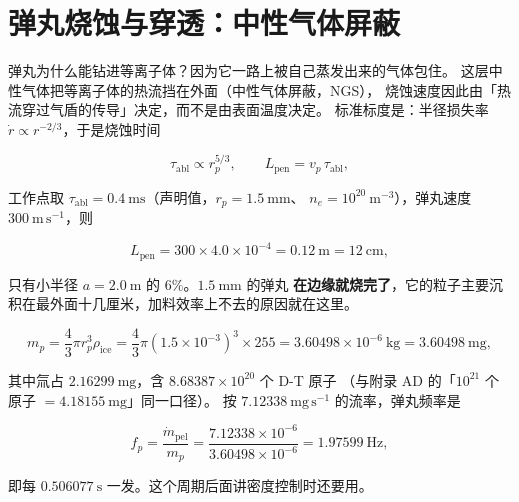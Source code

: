 \section{弹丸烧蚀与穿透：中性气体屏蔽}
\label{sec:app-aj-pellet}

弹丸为什么能钻进等离子体？因为它一路上被自己蒸发出来的气体包住。
这层中性气体把等离子体的热流挡在外面（中性气体屏蔽，NGS），
烧蚀速度因此由「热流穿过气盾的传导」决定，而不是由表面温度决定。
标准标度是：半径损失率 $\dot r \propto r^{-2/3}$，于是烧蚀时间

\begin{equation}
\tau_{\mathrm{abl}} \propto r_p^{5/3},
\qquad
L_{\mathrm{pen}} = v_p\,\tau_{\mathrm{abl}},
\label{eq:app-aj-abl}
\end{equation}

工作点取 $\tau_{\mathrm{abl}} = 0.4\ \mathrm{ms}$（声明值，$r_p = 1.5\ \mathrm{mm}$、
$n_e = 10^{20}\ \mathrm{m^{-3}}$），弹丸速度 $300\ \mathrm{m\,s^{-1}}$，则

\begin{equation}
L_{\mathrm{pen}} = 300\times4.0\times10^{-4} = 0.12\ \mathrm{m} = 12\ \mathrm{cm},
\label{eq:app-aj-pen}
\end{equation}

只有小半径 $a = 2.0\ \mathrm{m}$ 的 $6\%$。$1.5\ \mathrm{mm}$ 的弹丸
\textbf{在边缘就烧完了}，它的粒子主要沉积在最外面十几厘米，加料效率上不去的原因就在这里。

\begin{equation}
m_p = \frac{4}{3}\pi r_p^{3}\rho_{\mathrm{ice}}
= \frac{4}{3}\pi(1.5\times10^{-3})^{3}\times255
= 3.60498\times10^{-6}\ \mathrm{kg} = 3.60498\ \mathrm{mg},
\label{eq:app-aj-pelletmass2}
\end{equation}

其中氚占 $2.16299\ \mathrm{mg}$，含 $8.68387\times10^{20}$ 个 D-T 原子
（与附录 AD 的「$10^{21}$ 个原子 $= 4.18155\ \mathrm{mg}$」同一口径）。
按 $7.12338\ \mathrm{mg\,s^{-1}}$ 的流率，弹丸频率是

\begin{equation}
f_p = \frac{\dot m_{\mathrm{pel}}}{m_p}
= \frac{7.12338\times10^{-6}}{3.60498\times10^{-6}} = 1.97599\ \mathrm{Hz},
\label{eq:app-aj-pelletfreq}
\end{equation}

即每 $0.506077\ \mathrm{s}$ 一发。这个周期后面讲密度控制时还要用。

